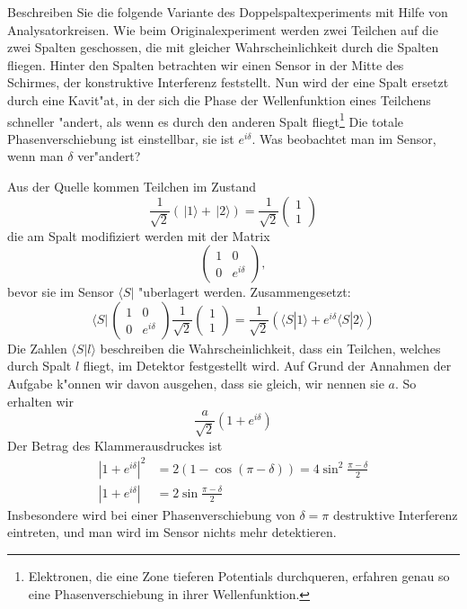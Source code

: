 Beschreiben Sie die folgende Variante des Doppelspaltexperiments mit Hilfe 
von Analysatorkreisen.
Wie beim Originalexperiment werden zwei Teilchen auf die zwei Spalten
geschossen, die mit gleicher Wahrscheinlichkeit durch die Spalten fliegen.
Hinter den Spalten betrachten wir einen Sensor in der Mitte des Schirmes,
der konstruktive Interferenz feststellt.
Nun wird der eine Spalt ersetzt durch eine Kavit"at, in der sich die Phase
der Wellenfunktion eines Teilchens schneller "andert, als wenn es durch
den anderen Spalt fliegt\footnote{Elektronen, die eine Zone tieferen
Potentials durchqueren, erfahren genau so eine Phasenverschiebung in
ihrer Wellenfunktion.}
Die totale Phasenverschiebung ist einstellbar, sie ist $e^{i\delta}$.
Was beobachtet man im Sensor, wenn man $\delta$ ver"andert?

\begin{loesung}
Aus der Quelle kommen Teilchen im Zustand
\[
\frac1{\sqrt{2}}(\,|1\rangle+\,|2\rangle)
=
\frac1{\sqrt{2}}
\begin{pmatrix}
1\\1
\end{pmatrix}
\]
die am Spalt modifiziert werden mit der Matrix
\[
\begin{pmatrix}
1&0\\
0&e^{i\delta}
\end{pmatrix},
\]
bevor sie im Sensor $\langle S|$ "uberlagert werden.
Zusammengesetzt:
\[
\langle S|\,
\begin{pmatrix}
1&0\\
0&e^{i\delta}
\end{pmatrix}
\frac1{\sqrt{2}}
\begin{pmatrix}
1\\1
\end{pmatrix}
=
\frac1{\sqrt{2}}(
\langle S|1\rangle + e^{i\delta}\langle S|2\rangle
)
\]
Die Zahlen
$\langle S|l\rangle$
beschreiben die Wahrscheinlichkeit, dass ein Teilchen, welches durch
Spalt $l$ fliegt, im Detektor festgestellt wird.
Auf Grund der Annahmen der Aufgabe k"onnen wir davon ausgehen, dass
sie gleich, wir nennen sie $a$. So erhalten wir
\[
\frac{a}{\sqrt{2}}(1+e^{i\delta})
\]
Der Betrag des Klammerausdruckes ist
\begin{align*}
|1+e^{i\delta}|^2
&=2(1-\cos(\pi-\delta))
=4\sin^2\frac{\pi-\delta}2
\\
|1+e^{i\delta}|
&=
2\sin\frac{\pi-\delta}2
\end{align*}
Insbesondere wird bei einer Phasenverschiebung von $\delta=\pi$ 
destruktive Interferenz eintreten, und man wird im Sensor nichts
mehr detektieren.
\end{loesung}

